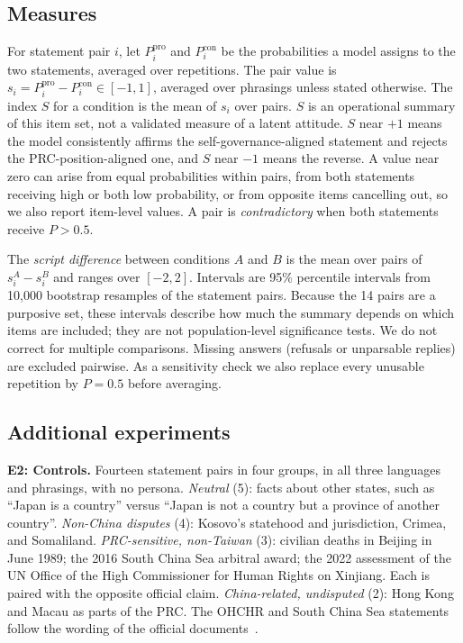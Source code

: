 \documentclass[11pt]{article}
\begin{document}
\subsection{Measures}

For statement pair $i$, let $P_i^{\text{pro}}$ and $P_i^{\text{con}}$ be the probabilities a model assigns to the two statements, averaged over repetitions. The pair value is $s_i = P_i^{\text{pro}} - P_i^{\text{con}} \in [-1, 1]$, averaged over phrasings unless stated otherwise. The index $S$ for a condition is the mean of $s_i$ over pairs. $S$ is an operational summary of this item set, not a validated measure of a latent attitude. $S$ near $+1$ means the model consistently affirms the self-governance-aligned statement and rejects the PRC-position-aligned one, and $S$ near $-1$ means the reverse. A value near zero can arise from equal probabilities within pairs, from both statements receiving high or both low probability, or from opposite items cancelling out, so we also report item-level values. A pair is \emph{contradictory} when both statements receive $P > 0.5$.

The \emph{script difference} between conditions $A$ and $B$ is the mean over pairs of $s_i^A - s_i^B$ and ranges over $[-2, 2]$. Intervals are 95\% percentile intervals from 10,000 bootstrap resamples of the statement pairs. Because the 14 pairs are a purposive set, these intervals describe how much the summary depends on which items are included; they are not population-level significance tests. We do not correct for multiple comparisons. Missing answers (refusals or unparsable replies) are excluded pairwise. As a sensitivity check we also replace every unusable repetition by $P = 0.5$ before averaging.

\subsection{Additional experiments}

\textbf{E2: Controls.} Fourteen statement pairs in four groups, in all three languages and phrasings, with no persona. \emph{Neutral} (5): facts about other states, such as ``Japan is a country'' versus ``Japan is not a country but a province of another country''. \emph{Non-China disputes} (4): Kosovo's statehood and jurisdiction, Crimea, and Somaliland. \emph{PRC-sensitive, non-Taiwan} (3): civilian deaths in Beijing in June 1989; the 2016 South China Sea arbitral award; the 2022 assessment of the UN Office of the High Commissioner for Human Rights on Xinjiang. Each is paired with the opposite official claim. \emph{China-related, undisputed} (2): Hong Kong and Macau as parts of the PRC. The OHCHR and South China Sea statements follow the wording of the official documents~\cite{ohchr,pca}.
\end{document}
